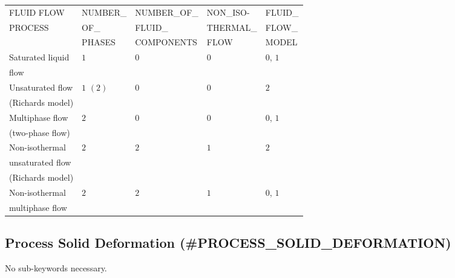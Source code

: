 \hspace{0.5cm}{\bf Keyword combinations for flow processes}

\begin{center}
\begin{tabular*}{14.9cm}{|p{}|p{}|p{}|p{2.3cm}|p{1.5cm}|} \hline
FLUID FLOW  & NUMBER\_   & NUMBER\_OF\_        & NON\_ISO-    & FLUID\_ \\
PROCESS     & OF\_       & FLUID\_             &THERMAL\_      & FLOW\_  \\
            & PHASES     &COMPONENTS           &FLOW           & MODEL        \\\hline \hline
Saturated liquid     & $1$   & $0$   & $0$   & $0$, $1$ \\
flow                 &       &       &       &
\\\hline
Unsaturated flow &$1$ $(2)$ &$0$ &$0$ & $2$ \\
(Richards model) &    &    &    &     \\\hline
%
Multiphase flow  &$2$ & $0$ & $0$ & $0$, $1$ \\
(two-phase flow) &    &    &    &      \\\hline
%
Non-isothermal &$2$ & $2$ & $1$ & $2$ \\
unsaturated flow &    &    &    &      \\
(Richards model) &    &    &    &      \\\hline
%
Non-isothermal &$2$ & $2$ & $1$ & $0$, $1$ \\
multiphase flow &    &    &    &      \\
%
\hline
\end{tabular*}
\end{center}



\subsection{Process Solid Deformation (\#PROCESS\_SOLID\_DEFORMATION)} No sub-keywords
necessary.


\newpage
